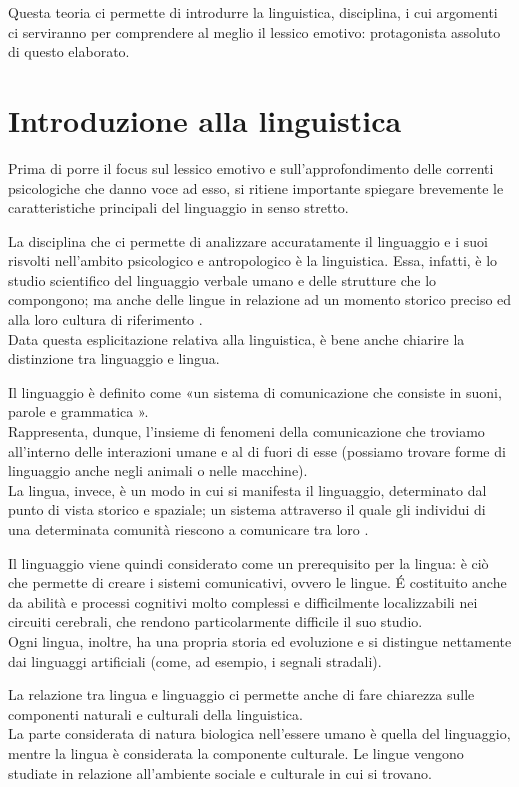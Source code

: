 Questa teoria ci permette di introdurre la linguistica, disciplina, i cui argomenti ci serviranno per comprendere al meglio il lessico emotivo: protagonista assoluto di questo elaborato. 

\section{Introduzione alla linguistica}
Prima di porre il focus sul lessico emotivo e sull'approfondimento delle correnti psicologiche che danno voce ad esso, si ritiene importante spiegare brevemente le caratteristiche principali del linguaggio in senso stretto.

La disciplina che ci permette di analizzare accuratamente il linguaggio e i suoi risvolti nell'ambito psicologico e antropologico è la linguistica. Essa, infatti, è lo studio scientifico del linguaggio verbale umano e delle strutture che lo compongono; ma anche delle lingue in relazione ad un momento storico preciso ed alla loro cultura di riferimento \parencite{introduzione_linguistica}.\\
Data questa esplicitazione relativa alla linguistica, è bene anche chiarire la distinzione tra linguaggio e lingua. 

Il linguaggio è definito come «un sistema di comunicazione che consiste in suoni, parole e grammatica \parencite{langauge}».\\
Rappresenta, dunque, l'insieme di fenomeni della comunicazione che troviamo all'interno delle interazioni umane e al di fuori di esse (possiamo trovare forme di linguaggio anche negli animali o nelle macchine). \\
La lingua, invece, è un modo in cui si manifesta il linguaggio, determinato dal punto di vista storico e spaziale; un sistema attraverso il quale gli individui di una determinata comunità riescono a comunicare tra loro \parencite{lingua}.

Il linguaggio viene quindi considerato come un prerequisito per la lingua: è ciò che permette di creare i sistemi comunicativi, ovvero le lingue. É costituito anche da abilità e processi cognitivi molto complessi e difficilmente localizzabili nei circuiti cerebrali, che rendono particolarmente difficile il suo studio.\\
Ogni lingua, inoltre, ha una propria storia ed evoluzione e si distingue nettamente dai linguaggi artificiali (come, ad esempio, i segnali stradali).

La relazione tra lingua e linguaggio ci permette anche di fare chiarezza sulle componenti naturali e culturali della linguistica.\\
La parte considerata di natura biologica nell'essere umano è quella del linguaggio, mentre la lingua è considerata la componente culturale. Le lingue vengono studiate in relazione all'ambiente sociale e culturale in cui si trovano.

